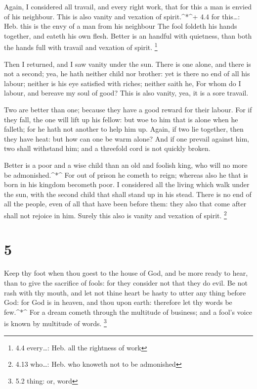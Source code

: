  Again, I considered all travail, and every right work, that
for this a man is envied of his neighbour. This is also vanity and
vexation of spirit.\^{}*\^{}+ 4.4 for this\ldots: Heb. this is the envy
of a man from his neighbour  The fool foldeth his hands
together, and eateth his own flesh.  Better is an handful
with quietness, than both the hands full with travail and vexation of
spirit. \footnote{4.4 every\ldots: Heb. all the rightness of work}

 Then I returned, and I saw vanity under the sun.
 There is one alone, and there is not a second; yea, he hath
neither child nor brother: yet is there no end of all his labour;
neither is his eye satisfied with riches; neither saith he, For whom do
I labour, and bereave my soul of good? This is also vanity, yea, it is a
sore travail.

 Two are better than one; because they have a good reward
for their labour.  For if they fall, the one will lift up
his fellow: but woe to him that is alone when he falleth; for he hath
not another to help him up.  Again, if two lie together,
then they have heat: but how can one be warm alone?  And if
one prevail against him, two shall withstand him; and a threefold cord
is not quickly broken.

 Better is a poor and a wise child than an old and foolish
king, who will no more be admonished.\^{}*\^{}  For out of
prison he cometh to reign; whereas also he that is born in his kingdom
becometh poor.  I considered all the living which walk
under the sun, with the second child that shall stand up in his stead.
 There is no end of all the people, even of all that have
been before them: they also that come after shall not rejoice in him.
Surely this also is vanity and vexation of spirit. \footnote{4.13
  who\ldots: Heb. who knoweth not to be admonished}

\hypertarget{section-4}{%
\section{5}\label{section-4}}

 Keep thy foot when thou goest to the house of God, and be
more ready to hear, than to give the sacrifice of fools: for they
consider not that they do evil.  Be not rash with thy mouth,
and let not thine heart be hasty to utter any thing before God: for God
is in heaven, and thou upon earth: therefore let thy words be
few.\^{}*\^{}  For a dream cometh through the multitude of
business; and a fool's voice is known by multitude of words. \footnote{5.2
  thing: or, word}

